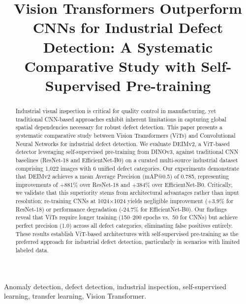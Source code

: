 \documentclass[journal,twoside,web]{ieeecolor}
\begin{document}
\title{Vision Transformers Outperform CNNs for Industrial Defect Detection: A Systematic Comparative Study with Self-Supervised Pre-training}


\maketitle

\begin{abstract}
Industrial visual inspection is critical for quality control in manufacturing, yet traditional CNN-based approaches exhibit inherent limitations in capturing global spatial dependencies necessary for robust defect detection. This paper presents a systematic comparative study between Vision Transformers (ViTs) and Convolutional Neural Networks for industrial defect detection. We evaluate DEIMv2, a ViT-based detector leveraging self-supervised pre-training from DINOv3, against traditional CNN baselines (ResNet-18 and EfficientNet-B0) on a curated multi-source industrial dataset comprising 1,022 images with 6 unified defect categories. Our experiments demonstrate that DEIMv2 achieves a mean Average Precision (mAP@0.5) of 0.785, representing improvements of +881\% over ResNet-18 and +384\% over EfficientNet-B0. Critically, we validate that this superiority stems from architectural advantages rather than input resolution: re-training CNNs at 1024$\times$1024 yields negligible improvement (+3.9\% for ResNet-18) or performance degradation (-24.7\% for EfficientNet-B0). Our findings reveal that ViTs require longer training (150--200 epochs vs.\ 50 for CNNs) but achieve perfect precision (1.0) across all defect categories, eliminating false positives entirely. These results establish ViT-based architectures with self-supervised pre-training as the preferred approach for industrial defect detection, particularly in scenarios with limited labeled data.
\end{abstract}

\begin{IEEEkeywords}
Anomaly detection, defect detection, industrial inspection, self-supervised learning, transfer learning, Vision Transformer.
\end{IEEEkeywords}
\end{document}
